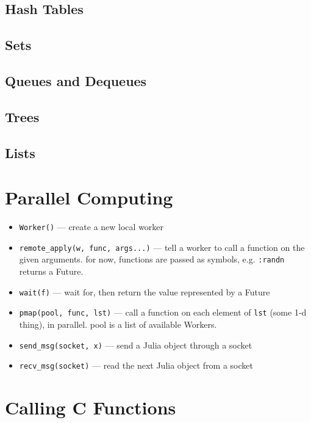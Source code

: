 \documentclass{article}
\begin{document}
\subsection{Hash Tables}
\subsection{Sets}
\subsection{Queues and Dequeues}
\subsection{Trees}
\subsection{Lists}

\section{Parallel Computing}
\begin{itemize}
  \item \verb|Worker()| ---
     create a new local worker

  \item \verb|remote_apply(w, func, args...)| ---
     tell a worker to call a function on the given arguments.
     for now, functions are passed as symbols, e.g. \verb|:randn|
     returns a Future.

   \item \verb|wait(f)| ---
     wait for, then return the value represented by a Future

   \item \verb|pmap(pool, func, lst)| ---
     call a function on each element of \verb|lst| (some 1-d thing), in
     parallel. pool is a list of available Workers.

   \item \verb|send_msg(socket, x)| ---
     send a Julia object through a socket

   \item \verb|recv_msg(socket)| ---
     read the next Julia object from a socket
\end{itemize}

\section{Calling C Functions}
\end{document}
